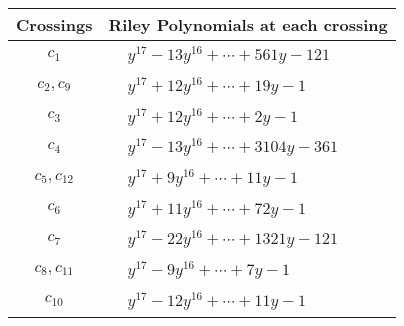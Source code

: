 \documentclass[1p]{elsarticle_modified}
\theoremstyle{definition}
\begin{document}
\begin{tabular}{m{50pt}|m{274pt}}
Crossings & \hspace{64pt}Riley Polynomials at each crossing \\
\hline $$\begin{aligned}c_{1}\end{aligned}$$&$\begin{aligned}
&y^{17}-13 y^{16}+\cdots+561 y-121
\end{aligned}$\\
\hline $$\begin{aligned}c_{2},c_{9}\end{aligned}$$&$\begin{aligned}
&y^{17}+12 y^{16}+\cdots+19 y-1
\end{aligned}$\\
\hline $$\begin{aligned}c_{3}\end{aligned}$$&$\begin{aligned}
&y^{17}+12 y^{16}+\cdots+2 y-1
\end{aligned}$\\
\hline $$\begin{aligned}c_{4}\end{aligned}$$&$\begin{aligned}
&y^{17}-13 y^{16}+\cdots+3104 y-361
\end{aligned}$\\
\hline $$\begin{aligned}c_{5},c_{12}\end{aligned}$$&$\begin{aligned}
&y^{17}+9 y^{16}+\cdots+11 y-1
\end{aligned}$\\
\hline $$\begin{aligned}c_{6}\end{aligned}$$&$\begin{aligned}
&y^{17}+11 y^{16}+\cdots+72 y-1
\end{aligned}$\\
\hline $$\begin{aligned}c_{7}\end{aligned}$$&$\begin{aligned}
&y^{17}-22 y^{16}+\cdots+1321 y-121
\end{aligned}$\\
\hline $$\begin{aligned}c_{8},c_{11}\end{aligned}$$&$\begin{aligned}
&y^{17}-9 y^{16}+\cdots+7 y-1
\end{aligned}$\\
\hline $$\begin{aligned}c_{10}\end{aligned}$$&$\begin{aligned}
&y^{17}-12 y^{16}+\cdots+11 y-1
\end{aligned}$\\
\hline
\end{tabular}\\~\\
\end{document}
